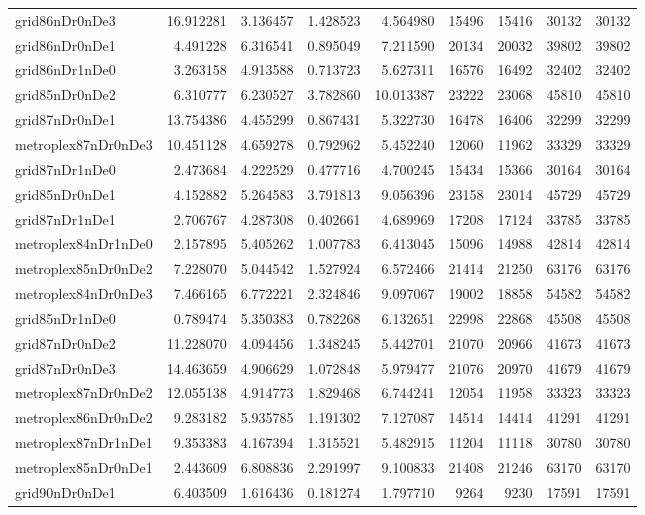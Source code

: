\begin{longtable}{|l|r|r|r|r|r|r|r|r|}
grid86nDr0nDe3 & 16.912281 & 3.136457 & 1.428523 & 4.564980 & 15496 & 15416 & 30132 & 30132 \\
grid86nDr0nDe1 & 4.491228 & 6.316541 & 0.895049 & 7.211590 & 20134 & 20032 & 39802 & 39802 \\
grid86nDr1nDe0 & 3.263158 & 4.913588 & 0.713723 & 5.627311 & 16576 & 16492 & 32402 & 32402 \\
grid85nDr0nDe2 & 6.310777 & 6.230527 & 3.782860 & 10.013387 & 23222 & 23068 & 45810 & 45810 \\
grid87nDr0nDe1 & 13.754386 & 4.455299 & 0.867431 & 5.322730 & 16478 & 16406 & 32299 & 32299 \\
metroplex87nDr0nDe3 & 10.451128 & 4.659278 & 0.792962 & 5.452240 & 12060 & 11962 & 33329 & 33329 \\
grid87nDr1nDe0 & 2.473684 & 4.222529 & 0.477716 & 4.700245 & 15434 & 15366 & 30164 & 30164 \\
grid85nDr0nDe1 & 4.152882 & 5.264583 & 3.791813 & 9.056396 & 23158 & 23014 & 45729 & 45729 \\
grid87nDr1nDe1 & 2.706767 & 4.287308 & 0.402661 & 4.689969 & 17208 & 17124 & 33785 & 33785 \\
metroplex84nDr1nDe0 & 2.157895 & 5.405262 & 1.007783 & 6.413045 & 15096 & 14988 & 42814 & 42814 \\
metroplex85nDr0nDe2 & 7.228070 & 5.044542 & 1.527924 & 6.572466 & 21414 & 21250 & 63176 & 63176 \\
metroplex84nDr0nDe3 & 7.466165 & 6.772221 & 2.324846 & 9.097067 & 19002 & 18858 & 54582 & 54582 \\
grid85nDr1nDe0 & 0.789474 & 5.350383 & 0.782268 & 6.132651 & 22998 & 22868 & 45508 & 45508 \\
grid87nDr0nDe2 & 11.228070 & 4.094456 & 1.348245 & 5.442701 & 21070 & 20966 & 41673 & 41673 \\
grid87nDr0nDe3 & 14.463659 & 4.906629 & 1.072848 & 5.979477 & 21076 & 20970 & 41679 & 41679 \\
metroplex87nDr0nDe2 & 12.055138 & 4.914773 & 1.829468 & 6.744241 & 12054 & 11958 & 33323 & 33323 \\
metroplex86nDr0nDe2 & 9.283182 & 5.935785 & 1.191302 & 7.127087 & 14514 & 14414 & 41291 & 41291 \\
metroplex87nDr1nDe1 & 9.353383 & 4.167394 & 1.315521 & 5.482915 & 11204 & 11118 & 30780 & 30780 \\
metroplex85nDr0nDe1 & 2.443609 & 6.808836 & 2.291997 & 9.100833 & 21408 & 21246 & 63170 & 63170 \\
grid90nDr0nDe1 & 6.403509 & 1.616436 & 0.181274 & 1.797710 & 9264 & 9230 & 17591 & 17591 \\

\end{longtable}
